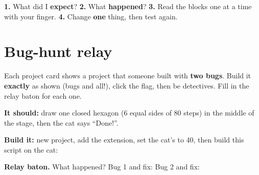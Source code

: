 \begin{tip}
\textbf{1.} What did I \textbf{expect}? \quad \textbf{2.} What \textbf{happened}? \quad \textbf{3.} Read the blocks one at a time with your finger. \quad \textbf{4.} Change \textbf{one} thing, then test again.
\end{tip}

\section{Bug-hunt relay}
Each project card shows a project that someone built with \textbf{two bugs}. Build it \textbf{exactly} as shown (bugs and all!), click the flag, then be detectives. Fill in the relay baton for each one.

\begin{exercise}
\textbf{It should:} draw one closed hexagon (6 equal sides of 80 steps) in the middle of the stage, then the cat says \enquote{Done!}.

\textbf{Build it:} new project, add the  extension, set the cat's  to 40, then build this script on the cat:
\begin{center}
\begin{scratch}[scale=0.78]
\end{scratch}
\end{center}
\textbf{Relay baton.} What happened? 
Bug 1 and fix: 
Bug 2 and fix: 
\end{exercise}

